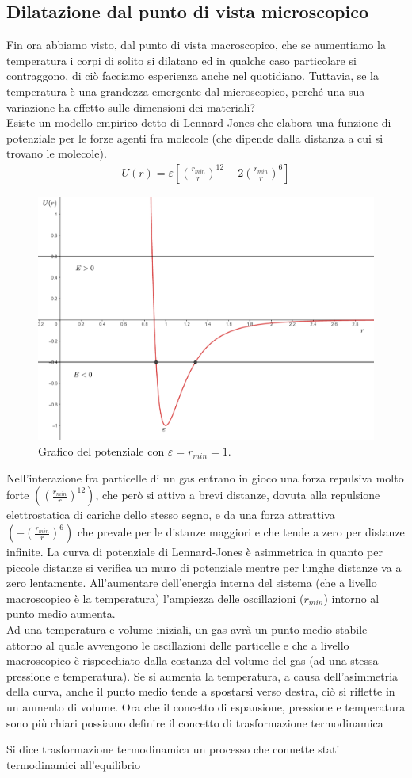 \documentclass[
10pt, %
a4paper, %
oneside, %
headinclude,footinclude, %
BCOR5mm, %
]{scrartcl}
\begin{document}
\subsection{Dilatazione dal punto di vista microscopico}
Fin ora abbiamo visto, dal punto di vista macroscopico, che se aumentiamo la temperatura i corpi di solito si dilatano ed in qualche caso particolare si contraggono, di ciò facciamo esperienza anche nel quotidiano. Tuttavia, se la temperatura è una grandezza emergente dal microscopico, perché una sua variazione ha effetto sulle dimensioni dei materiali?\\
Esiste un modello empirico detto di Lennard-Jones che elabora una funzione di potenziale per le forze agenti fra molecole (che dipende dalla distanza a cui si trovano le molecole). 
\begin{align*} 
	U(r) = \varepsilon\left[\left(\frac{r_{min}}{r}\right)^{12}-2\left(\frac{r_{min}}{r}\right)^6\right]
\end{align*} 
\begin{figure}[h!]
	\centering
	\includegraphics[width=0.6\linewidth]{../images/../images/Lennard-Jones_model}
	\caption{Grafico del potenziale con $\varepsilon =r_{min} = 1$.}
	\label{fig:lennard-jonesmodel}
\end{figure}
\FloatBarrier
Nell'interazione fra particelle di un gas entrano in gioco una forza repulsiva molto forte $((\frac{r_{min}}{r})^{12})$, che però si attiva a brevi distanze, dovuta alla repulsione elettrostatica di cariche dello stesso segno, e da una forza attrattiva $(-(\frac{r_{min}}{r})^6)$ che prevale per le distanze maggiori e che tende a zero per distanze infinite. La curva di potenziale di Lennard-Jones è asimmetrica in quanto per piccole distanze si verifica un muro di potenziale mentre per lunghe distanze va a zero lentamente. All'aumentare dell'energia interna del sistema (che a livello macroscopico è la temperatura) l'ampiezza delle oscillazioni ($r_{min}$) intorno al punto medio aumenta.\\
Ad una temperatura e volume iniziali, un gas avrà un punto medio stabile attorno al quale avvengono le oscillazioni delle particelle e che a livello macroscopico è rispecchiato dalla costanza del volume del gas (ad una stessa pressione e temperatura). Se si aumenta la temperatura, a causa dell'asimmetria della curva, anche il punto medio tende a spostarsi verso destra, ciò si riflette in un aumento di volume. Ora che il concetto di espansione, pressione e temperatura sono più chiari possiamo definire il concetto di trasformazione termodinamica
\begin{definition}
	Si dice trasformazione termodinamica un processo che connette stati termodinamici all'equilibrio
\end{definition}
\end{document}
